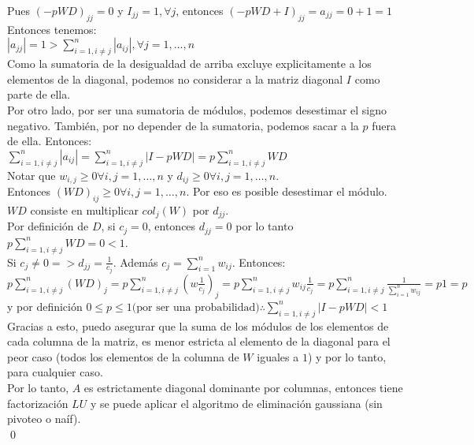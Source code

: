 		Pues $(-pWD)_{jj} = 0$ y $I_{jj} = 1, \forall j$, entonces $(-pWD + I)_{jj} = a_{jj} = 0 + 1 = 1$ \\

		Entonces tenemos: \\

		$|a_{jj}| = 1 > \sum_{i=1, i \neq j}^{n} |a_{ij}|, \forall j = 1, \hdots, n$ \\

		Como la sumatoria de la desigualdad de arriba excluye explicitamente a los elementos de la diagonal, podemos no considerar a la matriz diagonal $I$ como parte de ella. \\

		Por otro lado, por ser una sumatoria de módulos, podemos desestimar el signo negativo. También, por no depender de la sumatoria, podemos sacar a la $p$ fuera de ella. Entonces: \\

		$\sum_{i=1, i \neq j}^{n} |a_{ij}| = \sum_{i=1, i \neq j}^{n} |I-pWD| = p \sum_{i=1, i \neq j}^{n} WD$ \\

		Notar que $w_{i,j} \geq 0 \forall i,j = 1, \hdots, n$ y $d_{ij} \geq 0 \forall i,j = 1, \hdots, n$. \\

		Entonces $(WD)_{ij} \geq 0 \forall i,j = 1, \hdots, n$. Por eso es posible desestimar el módulo. \\

		$WD$ consiste en multiplicar $col_{j}(W)$ por $d_{jj}$. \\

		Por definición de $D$, si $c_{j} = 0$, entonces $d_{jj} = 0$ por lo tanto $p \sum_{i=1, i \neq j}^{n} WD = 0 < 1$. \\

		Si $c_{j} \neq 0 => d_{jj} = \frac{1}{c_{j}}$. Además $c_{j} = \sum_{i=1}^{n} w_{ij}$. Entonces:\\

		$ p \sum_{i=1, i \neq j}^{n} (WD)_{j} = p \sum_{i=1, i \neq j}^{n} (w \frac{1}{c_{j}})_{j} =
		  p \sum_{i=1, i \neq j}^{n} w_{ij} \frac{1}{c_j} = p \sum_{i=1, i \neq j}^{n} \frac{1}{\sum_{i=1}^{n} w_{ij}} =
		  p 1 = p													$ \\

		y por definición $0 \leq p \leq 1 \text{(por ser una probabilidad)} \therefore \sum_{i=1, i \neq j}^{n} |I-pWD| < 1$ \\

		Gracias a esto, puedo asegurar que la suma de los módulos de los elementos de cada columna de la matriz, es menor estricta al elemento de la diagonal para el peor caso (todos los elementos de la columna de $W$ iguales a $1$) y por lo tanto, para cualquier caso. \\

		Por lo tanto, $A$ es estrictamente diagonal dominante por columnas, entonces tiene factorización $LU$ y se puede aplicar el algoritmo de eliminación gaussiana (sin pivoteo o naíf). \\

		\qed

	\clearpage

